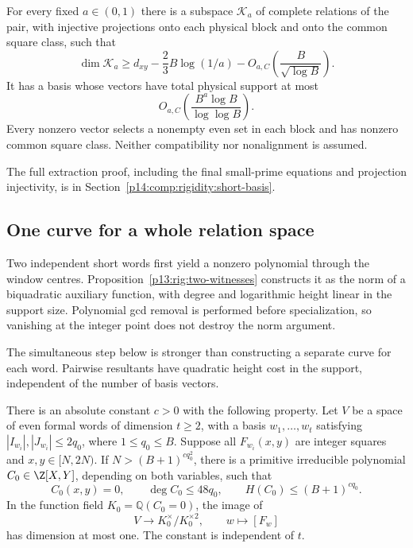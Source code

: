 \begin{theorem}
\label{p13:rig:short-basis}
For every fixed $a\in(0,1)$ there is a subspace $\mathcal K_a$
of complete relations of the pair, with injective projections
onto each physical block and onto the common square class,
such that
\begin{equation}
 \dim\mathcal K_a\ge d_{xy}-\frac23B\log(1/a)
                    -O_{a,C}\!\left(\frac B{\sqrt{\log B}}\right).
 \label{p13:rig:short-dimension}
\end{equation}
It has a basis whose vectors have total physical support at most
\begin{equation}
                    O_{a,C}\!\left(
                         \frac{B^a\log B}{\log\log B}\right).
 \label{p13:rig:short-support}
\end{equation}
Every nonzero vector selects a nonempty even set in each block
and has nonzero common square class.  Neither compatibility nor
nonalignment is assumed.
\end{theorem}

The full extraction proof, including the final small-prime equations
and projection injectivity, is in
Section~\ref{p14:comp:rigidity:short-basis}.

\subsection{One curve for a whole relation space}

Two independent short words first yield a nonzero polynomial through
the window centres.  Proposition~\ref{p13:rig:two-witnesses} constructs
it as the norm of a biquadratic auxiliary function, with degree and
logarithmic height linear in the support size.  Polynomial gcd removal
is performed before specialization, so vanishing at the integer point
does not destroy the norm argument.

The simultaneous step below is stronger than constructing a separate
curve for each word.  Pairwise resultants have quadratic height cost
in the support, independent of the number of basis vectors.

\begin{theorem}
\label{p13:rig:common-curve}
There is an absolute constant $c>0$ with the following property.
Let $V$ be a space of even formal words of dimension $t\ge2$,
with a basis $w_1,\ldots,w_t$ satisfying
$|I_{w_i}|,|J_{w_i}|\le2q_0$, where $1\le q_0\le B$.
Suppose all $F_{w_i}(x,y)$ are integer squares and
$x,y\in[N,2N)$.  If $N>(B+1)^{cq_0^2}$, there is a
primitive irreducible polynomial $C_0\in\Z[X,Y]$, depending
on both variables, such that
\begin{equation}
 C_0(x,y)=0,\qquad \deg C_0\le48q_0,
 \qquad H(C_0)\le(B+1)^{cq_0}.
 \label{p13:rig:common-degree-height}
\end{equation}
In the function field $K_0=\mathbb Q(C_0=0)$, the image of
\[
               V\longrightarrow K_0^\times/K_0^{\times2},
                  \qquad w\longmapsto[F_w]
\]
has dimension at most one.  The constant is independent of $t$.
\end{theorem}

